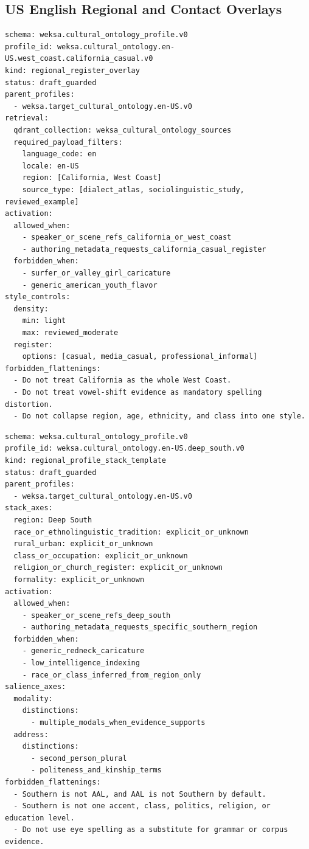 \documentclass[11pt]{article}
\begin{document}
\subsection{US English Regional and Contact Overlays}

\begin{lstlisting}[basicstyle=\ttfamily\small,breaklines=true]
schema: weksa.cultural_ontology_profile.v0
profile_id: weksa.cultural_ontology.en-US.west_coast.california_casual.v0
kind: regional_register_overlay
status: draft_guarded
parent_profiles:
  - weksa.target_cultural_ontology.en-US.v0
retrieval:
  qdrant_collection: weksa_cultural_ontology_sources
  required_payload_filters:
    language_code: en
    locale: en-US
    region: [California, West Coast]
    source_type: [dialect_atlas, sociolinguistic_study, reviewed_example]
activation:
  allowed_when:
    - speaker_or_scene_refs_california_or_west_coast
    - authoring_metadata_requests_california_casual_register
  forbidden_when:
    - surfer_or_valley_girl_caricature
    - generic_american_youth_flavor
style_controls:
  density:
    min: light
    max: reviewed_moderate
  register:
    options: [casual, media_casual, professional_informal]
forbidden_flattenings:
  - Do not treat California as the whole West Coast.
  - Do not treat vowel-shift evidence as mandatory spelling distortion.
  - Do not collapse region, age, ethnicity, and class into one style.
\end{lstlisting}

\begin{lstlisting}[basicstyle=\ttfamily\small,breaklines=true]
schema: weksa.cultural_ontology_profile.v0
profile_id: weksa.cultural_ontology.en-US.deep_south.v0
kind: regional_profile_stack_template
status: draft_guarded
parent_profiles:
  - weksa.target_cultural_ontology.en-US.v0
stack_axes:
  region: Deep South
  race_or_ethnolinguistic_tradition: explicit_or_unknown
  rural_urban: explicit_or_unknown
  class_or_occupation: explicit_or_unknown
  religion_or_church_register: explicit_or_unknown
  formality: explicit_or_unknown
activation:
  allowed_when:
    - speaker_or_scene_refs_deep_south
    - authoring_metadata_requests_specific_southern_region
  forbidden_when:
    - generic_redneck_caricature
    - low_intelligence_indexing
    - race_or_class_inferred_from_region_only
salience_axes:
  modality:
    distinctions:
      - multiple_modals_when_evidence_supports
  address:
    distinctions:
      - second_person_plural
      - politeness_and_kinship_terms
forbidden_flattenings:
  - Southern is not AAL, and AAL is not Southern by default.
  - Southern is not one accent, class, politics, religion, or education level.
  - Do not use eye spelling as a substitute for grammar or corpus evidence.
\end{lstlisting}
\end{document}
